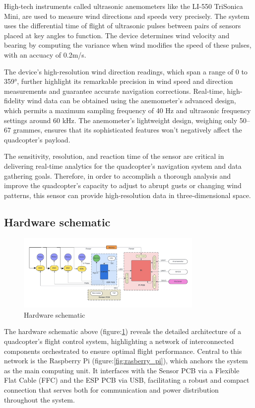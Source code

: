 \documentclass{article}
\begin{document}
High-tech instruments called ultrasonic anemometers like the LI-550 TriSonica Mini, are used to measure wind directions and speeds very precisely. The system uses the differential time of flight of ultrasonic pulses between pairs of sensors placed at key angles to function. The device determines wind velocity and bearing by computing the variance when wind modifies the speed of these pulses, with an accuacy of 0.2m/s.

The device's high-resolution wind direction readings, which span a range of 0 to 359°, further highlight its remarkable precision in wind speed and direction measurements and guarantee accurate navigation corrections. Real-time, high-fidelity wind data can be obtained using the anemometer's advanced design, which permits a maximum sampling frequency of 40 Hz and ultrasonic frequency settings around 60 kHz. The anemometer's lightweight design, weighing only 50–67 grammes, ensures that its sophisticated features won't negatively affect the quadcopter's payload.

The sensitivity, resolution, and reaction time of the sensor are critical in delivering real-time analytics for the quadcopter's navigation system and data gathering goals. Therefore, in order to accomplish a thorough analysis and improve the quadcopter's capacity to adjust to abrupt gusts or changing wind patterns, this sensor can provide high-resolution data in three-dimensional space.
\subsection{Hardware schematic}
\begin{figure}[H]
  \centering
  \includegraphics[width=0.8\textwidth]{Pictures/Hardware_schematic.png}
  \caption{Hardware schematic}
  \label{fig:hardware_schematic}
\end{figure}

The hardware schematic above (figure:\ref{fig:hardware_schematic}) reveals the detailed architecture of a quadcopter's flight control system, highlighting a network of interconnected components orchestrated to ensure optimal flight performance. Central to this network is the Raspberry Pi (figure:\ref{fig:rasberry_pi}), which anchors the system as the main computing unit. It interfaces with the Sensor PCB via a Flexible Flat Cable (FFC) and the ESP PCB via USB, facilitating a robust and compact connection that 
serves both for communication and power distribution throughout the system.
\end{document}
